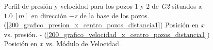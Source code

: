 \documentclass[10pt,a4paper,final]{article}
\begin{document}
\begin{figure}[tbhp]
   \centering
   \hspace{0.1\linewidth}
    \caption{Perfil de presión y velocidad para los pozos 1 y 2 de \emph{G2} situados a $1.0~[m]$ en dirección $-z$ de la base de los pozos. (\ref{200_grafico_presion_x_centro_pozos_distancia1}) Posición en $x$ vs. presión. - (\ref{200_grafico_velocidad_x_centro_pozos_distancia1}) Posición en $x$ vs. Módulo de Velocidad.}
   \label{200_grafico_velocidad_presion_centro_pozos_distancia1}                %
\end{figure}
\end{document}
